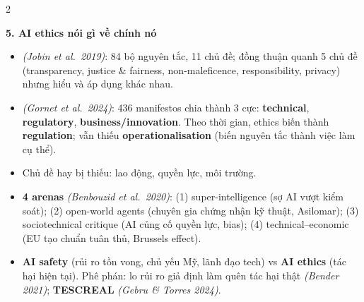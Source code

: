 \documentclass[10pt]{article}
\newcommand{\kw}[1]{\textbf{#1}}
\newcommand{\ct}[1]{{\color{h1}\itshape(#1)}}
\newcommand{\sect}[1]{\par\vspace{6pt}\noindent\colorbox{h1}{\parbox{\dimexpr\linewidth-2\fboxsep}{\large\bfseries\color{white}#1}}\par\vspace{2pt}}
\begin{document}
\begin{multicols}{2}
\sect{5. AI ethics nói gì về chính nó}
\begin{itemize}
\item \ct{Jobin et al.\ 2019}: 84 bộ nguyên tắc, 11 chủ đề; đồng thuận quanh 5 chủ đề (transparency, justice \& fairness, non-maleficence, responsibility, privacy) nhưng hiểu và áp dụng khác nhau.
\item \ct{Gornet et al.\ 2024}: 436 manifestos chia thành 3 cực: \kw{technical}, \kw{regulatory}, \kw{business/innovation}. Theo thời gian, ethics biến thành \kw{regulation}; vẫn thiếu \kw{operationalisation} (biến nguyên tắc thành việc làm cụ thể).
\item Chủ đề hay bị thiếu: lao động, quyền lực, môi trường.
\item \textbf{4 arenas} \ct{Benbouzid et al.\ 2020}: (1) super-intelligence (sợ AI vượt kiểm soát); (2) open-world agents (chuyên gia chứng nhận kỹ thuật, Asilomar); (3) sociotechnical critique (AI củng cố quyền lực, bias); (4) technical--economic (EU tạo chuẩn tuân thủ, Brussels effect).
\item \kw{AI safety} (rủi ro tồn vong, chủ yếu Mỹ, lãnh đạo tech) vs \kw{AI ethics} (tác hại hiện tại). Phê phán: lo rủi ro giả định làm quên tác hại thật \ct{Bender 2021}; \kw{TESCREAL} \ct{Gebru \& Torres 2024}.
\end{itemize}


\end{multicols}
\end{document}
